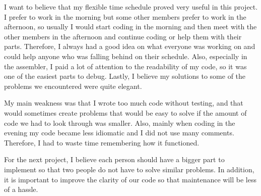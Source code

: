 \documentclass{article}
\begin{document}
 I want to believe that my flexible time schedule proved very useful in this project. I prefer to work in the morning but some other members prefer to work in the afternoon, so usually I would start coding in the morning and then meet with the other members in the afternoon and continue coding or help them with their parts. Therefore, I always had a good idea on what everyone was working on and could help anyone who was falling behind on their schedule. Also, especially in the assembler, I paid a lot of attention to the readability of my code, so it was one of the easiest parts to debug. Lastly, I believe my solutions to some of the problems we encountered were quite elegant. \\ \par \noindent

My main weakness was that I wrote too much code without testing, and that would sometimes create problems that would be easy to solve if the amount of code we had to look through was smaller. Also, mainly when coding in the evening my code became less idiomatic and I did not use many comments. Therefore, I had to waste time remembering how it functioned.\\ \par \noindent

For the next project, I believe each person should have a bigger part to implement so that two people do not have to solve similar problems. In addition, it is important to improve the clarity of our code so that maintenance will be less of a hassle.\\ \par \noindent
\end{document}
